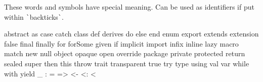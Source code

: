 \documentclass[article, a5paper]{memoir}
\newcommand{\LangColor}{scalared}
\newcommand{\head}[1]{{\bfseries {\color{\LangColor}{#1}}\par\vspace{1mm}\hrule\vspace{-2mm}}}
\newcommand{\Newline}{\vspace{\baselineskip}}
\newcommand{\LangTitle}[1]{{\centering \Huge{\bfseries\sffamily \color{\LangColor}{#1}}\par}}
\newcommand{\LangRect}[5]{\tikz[overlay, remember picture,inner sep=7pt,minimum height=0.65cm] \node[fill=#2,text=white,rotate=90] at #4 (name) {\large\normalfont\textbf{#1} ~~{\small \thepage(#5)}}; }
\newcommand{\LangRectOdd}[4]{\LangRect{#1}{#2}{#3}{($(current page.north east)-(0.35,#3)$)}{#4}}
\newcommand{\LangRectEven}[4]{\LangRect{#1}{#2}{#3}{($(current page.north west)-(-0.35,#3)$)}{#4}}
\newcommand{\LangMarker}[3]{%
\fancyfoot{} %
\fancyhead{
\ifodd\thepage\LangRectOdd{#1}{\LangColor}{#2}{#3}
\else\LangRectEven{#1}{\LangColor}{#2}{#3}
\fi
}
\renewcommand{\headrulewidth}{0pt}
\renewcommand{\footrulewidth}{0pt}
\pagestyle{fancy}
}
\begin{document}




\vspace*{0.5em}\head{Reserved words in Scala}\Newline
{\small These words and symbols have special meaning. Can be used as identifiers if put within \verb|`|backticks\verb|`|.}
\vspace*{-0.5em}
\begin{Code}[morekeywords={macro,\_},otherkeywords={>,<-,\%,<,>:,@,:,=,\#},basicstyle=\ttfamily\fontsize{8}{9}\selectfont]
abstract as case catch class def derives do else end enum export extends extension false 
final finally for forSome given if implicit import infix inline lazy macro match new null 
object opaque open override package private protected return sealed super then this throw 
trait transparent true try type using val var while with yield
 _   :   =   =>   <-   <:   <%
\end{Code}



\clearpage
\end{document}
